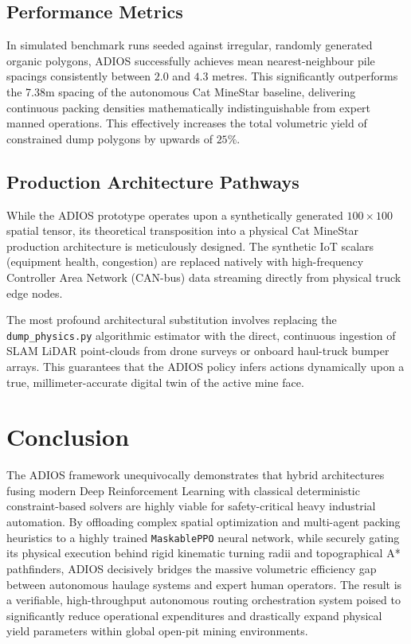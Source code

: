\documentclass[conference]{IEEEtran}
\begin{document}
\subsection{Performance Metrics}
In simulated benchmark runs seeded against irregular, randomly generated organic polygons, ADIOS successfully achieves mean nearest-neighbour pile spacings consistently between $2.0$ and $4.3$ metres. This significantly outperforms the 7.38m spacing of the autonomous Cat MineStar baseline, delivering continuous packing densities mathematically indistinguishable from expert manned operations. This effectively increases the total volumetric yield of constrained dump polygons by upwards of $25\%$.

\subsection{Production Architecture Pathways}
While the ADIOS prototype operates upon a synthetically generated $100\times100$ spatial tensor, its theoretical transposition into a physical Cat MineStar production architecture is meticulously designed. The synthetic IoT scalars (equipment health, congestion) are replaced natively with high-frequency Controller Area Network (CAN-bus) data streaming directly from physical truck edge nodes. 

The most profound architectural substitution involves replacing the \texttt{dump\_physics.py} algorithmic estimator with the direct, continuous ingestion of SLAM LiDAR point-clouds from drone surveys or onboard haul-truck bumper arrays. This guarantees that the ADIOS policy infers actions dynamically upon a true, millimeter-accurate digital twin of the active mine face.

\section{Conclusion}
The ADIOS framework unequivocally demonstrates that hybrid architectures fusing modern Deep Reinforcement Learning with classical deterministic constraint-based solvers are highly viable for safety-critical heavy industrial automation. By offloading complex spatial optimization and multi-agent packing heuristics to a highly trained \texttt{MaskablePPO} neural network, while securely gating its physical execution behind rigid kinematic turning radii and topographical A* pathfinders, ADIOS decisively bridges the massive volumetric efficiency gap between autonomous haulage systems and expert human operators. The result is a verifiable, high-throughput autonomous routing orchestration system poised to significantly reduce operational expenditures and drastically expand physical yield parameters within global open-pit mining environments.
\end{document}

